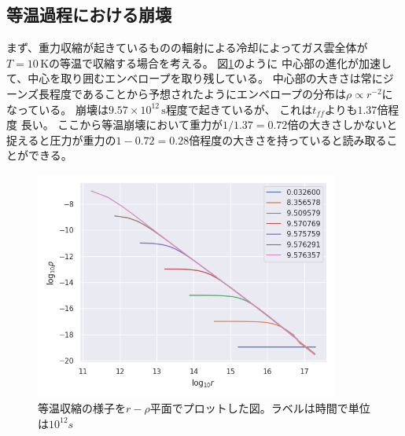 \documentclass[a4j, dvipdfmx]{jsarticle}
\begin{document}
\subsection{等温過程における崩壊}
まず、重力収縮が起きているものの輻射による冷却によってガス雲全体が$T=10\,\mathrm{K}$の等温で収縮する場合を考える。
図\ref{fig:rho_r_iso}のように
中心部の進化が加速して、中心を取り囲むエンベロープを取り残している。
中心部の大きさは常にジーンズ長程度であることから予想されたようにエンベロープの分布は$\rho \propto r^{-2}$になっている。
崩壊は$9.57 \times 10^{12}\,\mathrm{s}$程度で起きているが、
これは$t_{ff}$よりも$1.37$倍程度
長い。
ここから等温崩壊において重力が$1/1.37 = 0.72$倍の大きさしかないと捉えると圧力が重力の$1 - 0.72 =0.28$倍程度の大きさを持っていると読み取ることができる。
\begin{figure}[H]
    \includegraphics[clip,width=10.0cm]{graph/rho_r_iso.png}
    \caption{等温収縮の様子を$r-\rho$平面でプロットした図。ラベルは時間で単位は$10^{12}s$}
    \label{fig:rho_r_iso}
\end{figure}
\end{document}
